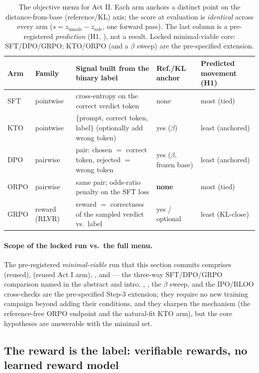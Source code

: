 \begin{table}[htbp]\centering\small\setlength{\tabcolsep}{5pt}
\caption{The objective menu for Act II. Each arm anchors a distinct point on the distance-from-base
(reference/KL) axis; the score at evaluation is \emph{identical} across every arm
($s=z_{\text{unsafe}}-z_{\text{safe}}$, one forward pass). The last column is a pre-registered
\emph{prediction} (H1, ), not a result. Locked minimal-viable core: SFT/DPO/GRPO;
KTO/ORPO (and a $\beta$ sweep) are the pre-specified extension.}
\label{tab:objective-menu}
\begin{tabular}{@{}llp{}lp{}@{}}
\toprule
Arm & Family & Signal built from the binary label & Ref./KL anchor & Predicted movement (H1) \\
\midrule
SFT  & pointwise    & cross-entropy on the correct verdict token & none            & most (tied) \\
KTO  & pointwise    & $\{$prompt, correct token, label$\}$ (optionally add wrong token) & yes ($\beta$) & least (anchored) \\
DPO  & pairwise     & pair: chosen $=$ correct token, rejected $=$ wrong token & yes ($\beta$, frozen base) & least (anchored) \\
ORPO & pairwise     & same pair; odds-ratio penalty on the SFT loss & \textbf{none}   & most (tied) \\
GRPO & reward (RLVR)& reward $=$ correctness of the sampled verdict vs.\ label & yes / optional & least (KL-close) \\
\bottomrule
\end{tabular}
\end{table}

\paragraph{Scope of the locked run vs.\ the full menu.} The pre-registered \emph{minimal-viable} run
that this section commits comprises  (reused),  (reused Act I arm), , and
 --- the three-way SFT/DPO/GRPO comparison named in the abstract and intro. ,
, the $\beta$ sweep, and the IPO/RLOO cross-checks are the pre-specified Step-3 extension; they
require no new training campaign beyond adding their conditions, and they sharpen the mechanism (the
reference-free ORPO endpoint and the natural-fit KTO arm), but the core hypotheses are answerable with the
minimal set.

\subsection{The reward is the label: verifiable rewards, no learned reward model}
\label{sec:actII-reward}

